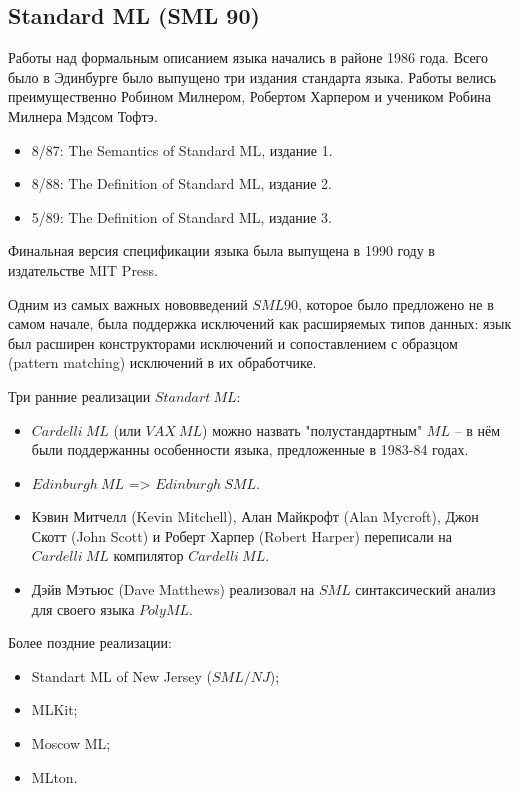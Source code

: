 \documentclass[14pt]{matmex-diploma-custom}
\begin{document}
\subsection{Standard ML (SML 90)}
Работы над формальным описанием языка начались в районе 1986 года. Всего было в Эдинбурге было выпущено три издания стандарта языка. Работы велись преимущественно Робином  Милнером, Робертом Харпером и учеником Робина Милнера Мэдсом Тофтэ.
\begin{itemize}
\item 8/87: The Semantics of Standard ML, издание 1.
\item 8/88: The Definition of Standard ML, издание 2.
\item 5/89: The Definition of Standard ML, издание 3.
\end{itemize}
Финальная версия спецификации языка была выпущена в 1990 году в издательстве MIT Press.

Одним из самых важных нововведений $SML 90$, которое было предложено не в самом начале, была поддержка исключений как расширяемых типов данных: язык был расширен конструкторами исключений и сопоставлением с образцом (pattern matching) исключений в их обработчике. 

Три ранние реализации $Standart\ M\!L$:
\begin{itemize}
\item $Cardelli\ M\!L$ (или $V\!AX\ M\!L$) можно назвать "полустандартным" $M\!L$ -- в нём были поддержанны особенности языка, предложенные в 1983-84 годах.
\item $Edinburgh\ ML$ => $Edinburgh\ SM\!L$.
\item Кэвин Митчелл (Kevin Mitchell), Алан Майкрофт (Alan Mycroft), Джон Скотт (John Scott) и Роберт Харпер (Robert Harper) переписали на $Cardelli\ ML$ компилятор 
$Cardelli\ ML$.
\item Дэйв Мэтьюс (Dave Matthews) реализовал на $SML$ синтаксический анализ для своего языка $PolyML$.
\end{itemize}

Более поздние реализации:
\begin{itemize}
 \item Standart ML of New Jersey ($SML/N\!J$);
 \item MLKit;
 \item Moscow ML;
 \item MLton.
\end{itemize}
\end{document}
